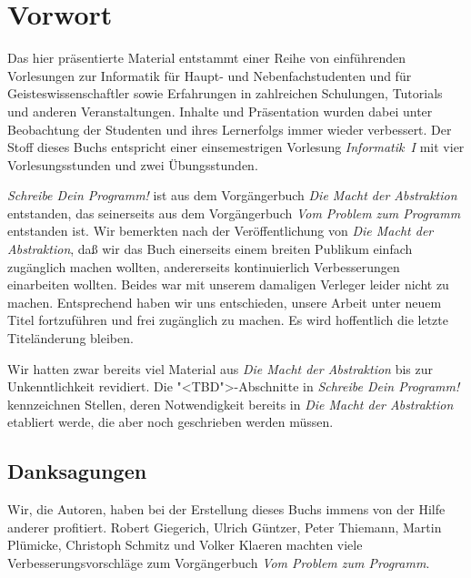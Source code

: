 
\chapter*{Vorwort}
\thispagestyle{empty}


Das hier präsentierte Material entstammt einer Reihe von einführenden
Vorlesungen zur Informatik für Haupt- und Nebenfachstudenten und für
Geisteswissenschaftler sowie Erfahrungen in zahlreichen Schulungen,
Tutorials und anderen Veranstaltungen.  Inhalte und Präsentation
wurden dabei unter Beobachtung der Studenten und ihres Lern\-er\-folgs
immer wieder verbessert.  Der Stoff dieses Buchs entspricht einer
einsemestrigen Vorlesung \textit{Informatik~I} mit vier
Vorlesungsstunden und zwei Übungsstunden.

\textit{Schreibe Dein Programm!} ist aus dem Vorgängerbuch \textit{Die
  Macht der Abstraktion} entstanden, das seinerseits aus dem
Vorgängerbuch \textit{Vom Problem zum Programm} entstanden ist.  Wir
bemerkten nach der Veröffentlichung von \textit{Die Macht der
  Abstraktion}, daß wir das Buch einerseits einem breiten Publikum
einfach zugänglich machen wollten, andererseits kontinuierlich
Verbesserungen einarbeiten wollten.  Beides war mit unserem damaligen
Verleger leider nicht zu machen.  Entsprechend haben wir uns
entschieden, unsere Arbeit unter neuem Titel fortzuführen und frei
zugänglich zu machen.  Es wird hoffentlich die letzte Titeländerung
bleiben.

Wir hatten zwar bereits viel Material aus \textit{Die Macht der
  Abstraktion} bis zur Unkenntlichkeit revidiert.  Die
"<TBD">-Abschnitte in \textit{Schreibe Dein Programm!} kennzeichnen
Stellen, deren Notwendigkeit bereits in \textit{Die Macht der
  Abstraktion} etabliert werde, die aber noch geschrieben werden
müssen.

\section*{Danksagungen}

Wir, die Autoren, haben bei der Erstellung dieses Buchs immens von der
Hilfe anderer profitiert.  Robert Giegerich, Ulrich Güntzer, Peter
Thiemann, Martin Plümicke, Christoph Schmitz und Volker Klaeren
machten viele Verbesserungsvorschläge zum Vorgängerbuch \textit{Vom
  Problem zum Programm}.

